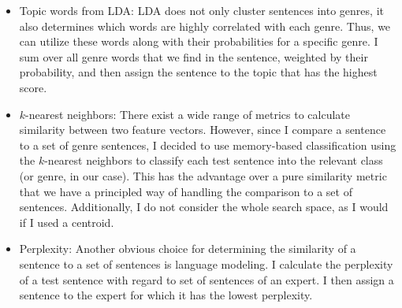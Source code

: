 \begin{itemize}
	\item Topic words from LDA: LDA does not only cluster sentences into genres, it also determines which words are highly correlated with each genre. Thus, we can utilize these words along with their probabilities for a specific genre. I sum over all genre words that we find in the sentence, weighted by their probability, and then assign the sentence to the topic that has the highest score. 
	
	\item $k$-nearest neighbors: There exist a wide range of metrics to calculate similarity between two feature vectors. However, since I compare a sentence to a set of genre sentences, I decided to use memory-based classification using the  $k$-nearest neighbors to classify each test sentence into the relevant class (or genre, in our case). This has the advantage over a pure similarity metric that we have a principled way of handling the comparison to a set of sentences. Additionally, I do not consider the whole search space, as I would if I used a centroid.
		\item Perplexity: Another obvious choice for determining the similarity of a sentence to a set of sentences is language modeling.  I calculate the perplexity of a test sentence with regard to set of sentences of an expert. I then assign a sentence to the expert for which it has the lowest perplexity. 
\end{itemize}





